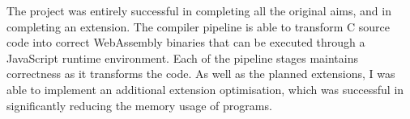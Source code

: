 \documentclass[00-main.tex]{subfiles}
\begin{document}
The project was entirely successful in completing all the original aims, and in completing an extension.
The compiler pipeline is able to transform C source code into correct WebAssembly binaries that can be executed through a JavaScript runtime environment.
Each of the pipeline stages maintains correctness as it transforms the code.
As well as the planned extensions, I was able to implement an additional extension optimisation, which was successful in significantly reducing the memory usage of programs.
\end{document}
